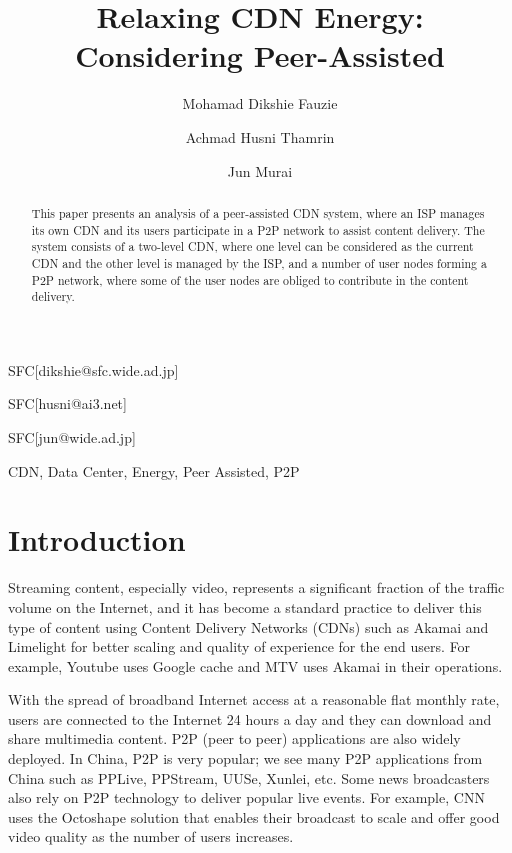 \documentclass[JIP]{ipsj}
\begin{document}
\title{Relaxing CDN Energy: Considering Peer-Assisted}


\author{Mohamad Dikshie Fauzie}{SFC}[dikshie@sfc.wide.ad.jp]
\author{Achmad Husni Thamrin}{SFC}[husni@ai3.net]
\author{Jun Murai}{SFC}[jun@wide.ad.jp]


\begin{abstract}
This paper presents an analysis of a peer-assisted CDN system, where an ISP manages its own CDN and its users participate in a P2P network to assist content delivery.
The system consists of a two-level CDN, where one level can be considered as the current CDN and the other level is managed by the ISP, and a number of user nodes forming a P2P network, where some of the user nodes are obliged to contribute in the content delivery.


\end{abstract}

\begin{keyword}
CDN, Data Center, Energy, Peer Assisted, P2P
\end{keyword}

\maketitle

\section{Introduction}\label{intro}
Streaming content, especially video, represents a significant fraction of the traffic volume on the Internet, and it has become a standard practice to deliver this type of content using Content Delivery Networks (CDNs) such as Akamai and Limelight for better scaling and quality of experience for the end users.  
For example, Youtube uses Google cache and MTV uses Akamai in their operations.

With the spread of broadband Internet access at a reasonable flat monthly rate, users are connected to the Internet 24 hours a day and they can download and share multimedia content.  
P2P (peer to peer) applications are also widely deployed.  
In China, P2P is very popular; we see many P2P applications from China such as PPLive, PPStream, UUSe, Xunlei, etc.  
Some news broadcasters also rely on P2P technology to deliver popular live events.  
For example, CNN uses the Octoshape solution that enables their broadcast to scale and offer good video quality as the number of users increases.
\end{document}
